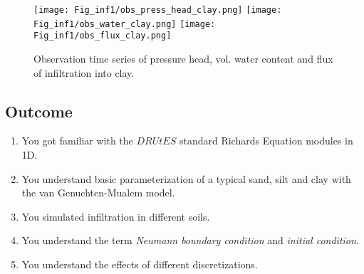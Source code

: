 \begin{figure}
\centering
\texttt{[image: Fig\_inf1/obs\_press\_head\_clay.png]}
\texttt{[image: Fig\_inf1/obs\_water\_clay.png]}
\texttt{[image: Fig\_inf1/obs\_flux\_clay.png]}
\caption{Observation time series of pressure head, vol. water content and flux of infiltration into clay.}

\end{figure}

\newpage
\newpage
\newpage
\newpage
\subsection{Outcome}
\begin{enumerate}
\item You got familiar with the $DRUtES$ standard Richards Equation modules in 1D.
\item You understand basic parameterization of a typical sand, silt and clay with the van Genuchten-Mualem model.
\item You simulated infiltration in different soils.
\item You understand the term \emph{Neumann boundary condition} and \emph{initial condition}.
\item You understand the effects of different discretizations.
\end{enumerate}
